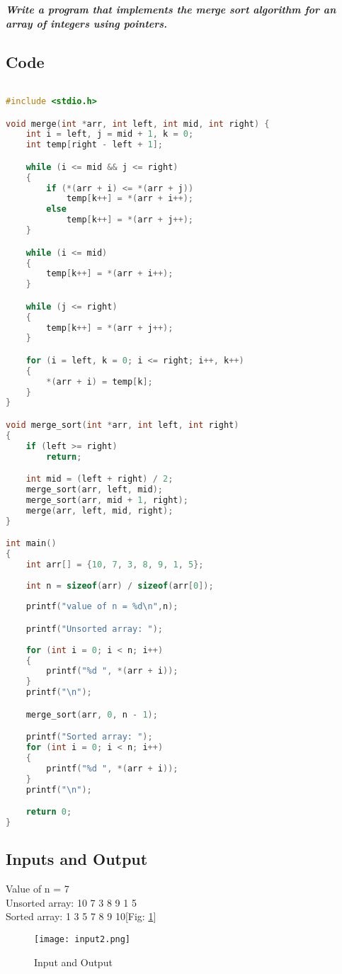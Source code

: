 \documentclass[12pt]{article}
\begin{document}
\emph{\textbf{Write a program that implements the merge sort algorithm for an array of integers using pointers.}}


\subsection{Code}
\begin{lstlisting}[language=C]

#include <stdio.h>

void merge(int *arr, int left, int mid, int right) {
    int i = left, j = mid + 1, k = 0;
    int temp[right - left + 1];

    while (i <= mid && j <= right) 
	{
        if (*(arr + i) <= *(arr + j))
            temp[k++] = *(arr + i++);
        else
            temp[k++] = *(arr + j++);
    }

    while (i <= mid)
    {
        temp[k++] = *(arr + i++);
	}

    while (j <= right)
    {
        temp[k++] = *(arr + j++);
    }

    for (i = left, k = 0; i <= right; i++, k++)
	{
        *(arr + i) = temp[k];
	}
}

void merge_sort(int *arr, int left, int right) 
{
    if (left >= right)
        return;

    int mid = (left + right) / 2;
    merge_sort(arr, left, mid);
    merge_sort(arr, mid + 1, right);
    merge(arr, left, mid, right);
}

int main() 
{
    int arr[] = {10, 7, 3, 8, 9, 1, 5};
    
    int n = sizeof(arr) / sizeof(arr[0]);
    
    printf("value of n = %d\n",n);

    printf("Unsorted array: ");
    
    for (int i = 0; i < n; i++)
    {
        printf("%d ", *(arr + i));
	}
    printf("\n");

    merge_sort(arr, 0, n - 1);

    printf("Sorted array: ");
    for (int i = 0; i < n; i++)
    {
        printf("%d ", *(arr + i));
    }
    printf("\n");

    return 0;
}

\end{lstlisting}

\subsection{Inputs and Output}
\begin{center}
Value of n = 7\\
Unsorted array: 10 7 3 8 9 1 5\\
Sorted array: 1 3 5 7 8 9 10[Fig: \ref{fig_input_output}]\\
\end{center}
\begin{figure}[h]
\centering
\texttt{[image: input2.png]}
\caption{Input and Output}
\label{fig_input_output}
\end{figure}
\end{document}
